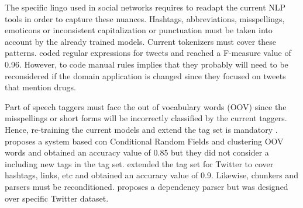 The specific lingo used in social networks requires to readapt the current NLP tools in order to capture these nuances. Hashtags, abbreviations, misspellings, emoticons or inconsistent capitalization or punctuation must be taken into account by the already trained models. Current tokenizers must cover these patterns. \citep{Nikfarjam2015} coded regular expressions for tweets and reached a F-measure value of 0.96. However, to code manual rules implies that they probably will need to be reconsidered if the domain application is changed since they focused on tweets that mention drugs.
\par Part of speech taggers must face the out of vocabulary words (OOV) since the misspellings or short forms will be incorrectly classified by the current taggers. Hence, re-training the current models and extend the tag set is mandatory \citep{synthesisLecturesSocial}. \citep{stanfordTwitterPosTagger} proposes a system based con Conditional Random Fields and clustering OOV words and obtained an accuracy value of 0.85 but they did not consider a including new tags in the tag set. \citep{gimpelPosSetExtended} extended the tag set for Twitter to cover hashtags, links, etc and obtained an accuracy value of 0.9. Likewise, chunkers and parsers must be reconditioned. \citep{khanParserAdaptation} proposes a dependency parser but was designed over specific Twitter dataset.
	
		

